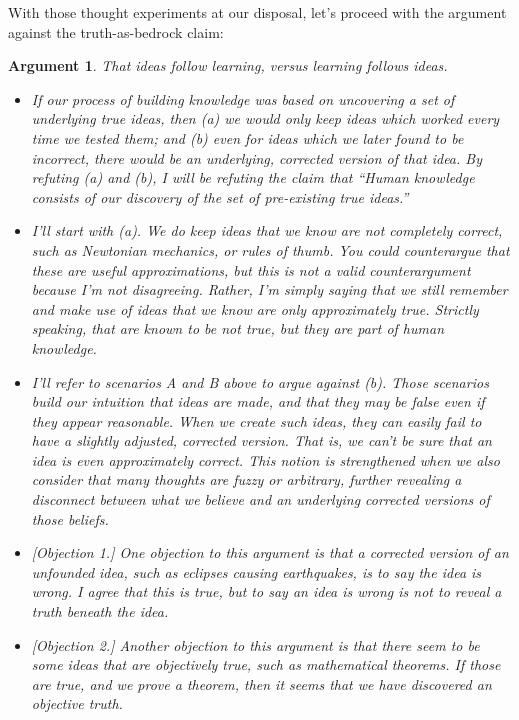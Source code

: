 \documentclass[11pt, oneside]{article}
\newtheorem*{argt}{Argument}
\begin{document}
With those thought experiments at our disposal, let's proceed with
the argument against the truth-as-bedrock claim:
\begin{argt} That ideas follow learning, versus learning follows ideas.
    \label{a7}
    \normalfont
\begin{itemize}
    \item{} If our process of building knowledge was based on uncovering a set
        of underlying true ideas, then (a) we would only keep ideas which worked
        every time we tested them; and (b) even for ideas which we later found
        to be incorrect, there would be an underlying, corrected version of that
        idea. By refuting (a) and (b), I will be refuting the claim that ``Human
        knowledge consists of our discovery of the set of pre-existing true
        ideas.''

    \item{} I'll start with (a). We do keep ideas that we know are not
        completely correct, such as Newtonian mechanics, or rules of thumb.
        You could counterargue that these are useful approximations, but this is
        not a valid counterargument because I'm not disagreeing.
        Rather, I'm simply saying that we still remember and make use of ideas
        that we know are only approximately true. Strictly speaking, that are
        known to be not true, but they are part of human knowledge.

    \item{} I'll refer to scenarios A and B above to argue against (b).
        Those scenarios build our intuition that ideas are {\em made}, and that
        they may be false even if they appear reasonable. When we create such
        ideas, they can easily fail to have a slightly adjusted, corrected
        version. That is, we can't be sure that an idea is
        even approximately correct. This notion is strengthened when we
        also consider that many thoughts are fuzzy or arbitrary, further
        revealing a disconnect between what we believe and an underlying
        corrected versions of those beliefs.

    \item{} [Objection 1.] One objection to this argument is that a corrected
        version of an unfounded idea, such as eclipses causing earthquakes, is
        to say the idea is wrong. I agree that this is true, but to say an idea
        is wrong is not to reveal a truth beneath the idea.

    \item{} [Objection 2.]
        Another objection to this argument is that there seem to be some ideas
        that are objectively true, such as mathematical theorems. If
        those are true, and we prove a theorem, then it seems that we have
        discovered an objective truth.


\end{itemize}
\end{argt}
\end{document}
